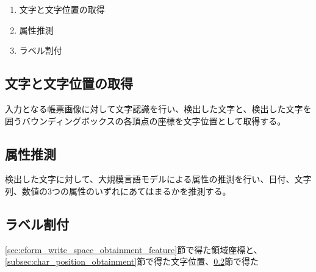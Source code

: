 \begin{enumerate}[label=(\arabic*)]
  \item 文字と文字位置の取得
  \item 属性推測
  \item ラベル割付
\end{enumerate}

\subsection{文字と文字位置の取得}\label{subsec:char_and_bbox_obtainment}
入力となる帳票画像に対して文字認識を行い、検出した文字と、検出した文字を囲うバウンディングボックスの各頂点の座標を文字位置として取得する。

\subsection{属性推測}\label{subsec:att_prediction}
検出した文字に対して、大規模言語モデルによる属性の推測を行い、日付、文字列、数値の3つの属性のいずれにあてはまるかを推測する。

\subsection{ラベル割付}\label{subsec:label_link}
\ref{sec:eform_write_space_obtainment_feature}節で得た領域座標と、\ref{subsec:char_position_obtainment}節で得た文字位置、\ref{subsec:att_prediction}節で得た
